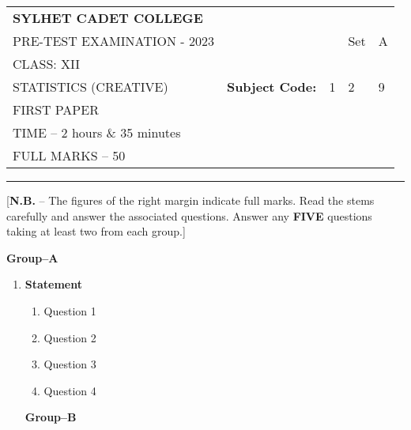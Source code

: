 \documentclass{article}
\begin{document}
\begin{table}[h]
\centering
\begin{tabular}{lllll}
\textbf{\large SYLHET CADET COLLEGE} &  &  &  &  \\ \cline{4-5} 
PRE-TEST EXAMINATION - 2023 &  & \multicolumn{1}{l|}{} & \multicolumn{1}{l|}{Set} & \multicolumn{1}{l|}{A} \\ \cline{4-5} 
CLASS: XII &  &  &  &  \\ \cline{3-5} 
STATISTICS (CREATIVE)& \multicolumn{1}{l|}{\textbf{Subject Code:}} & \multicolumn{1}{l|}{1} & \multicolumn{1}{l|}{2} & \multicolumn{1}{l|}{9} \\ \cline{3-5} 
 FIRST PAPER &  &  &  &  \\
TIME – 2 hours \& 35 minutes &  &  &  &  \\
FULL MARKS – 50 &  &  &  & 
\end{tabular}
\end{table}

\hrule

\begin{center}
[\textbf{N.B.} – The figures of the right margin indicate full marks. Read the stems carefully and answer the associated questions. Answer any \textbf{FIVE} questions taking at least two from each group.]\\

\end{center}

  \begin{center}
  \textbf{Group--A}
  \end{center}
  
  \begin{enumerate}
  
 \item
	  \textbf{Statement} 
  
  \begin{enumerate}
    \item
	Question \hfill 1
    \item
	Question \hfill 2
    \item  
	Question \hfill 3
    \item
	Question \hfill 4
  \end{enumerate}
  
    \begin{center}
  \textbf{Group--B}
  \end{center}
  

\end{enumerate}
\end{document}
